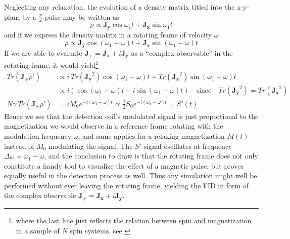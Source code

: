 \documentclass[11.5pt,a4paper]{article}
\begin{document}
Neglecting any relaxation, the evolution of a density matrix titled into the x-y-plane by a $\tfrac{\pi}{2}$-pulse may be written as 
\begin{equation}
 \rho \propto \mathbf{J_y} \cos \omega_1 t + \mathbf{J_x} \sin \omega_1 t
\end{equation}
and if we express the density matrix in a rotating frame of velocity $\omega$
\begin{equation}
 \rho \propto \mathbf{J_y} \cos (\omega_1-\omega) t + \mathbf{J_x} \sin (\omega_1-\omega) t
\end{equation}
If we are able to evaluate $\mathbf{J_+} = \mathbf{J_x} + i \mathbf{J_y}$ as a ``complex observable'' in the rotating frame, it would yield\footnote{where the last line just reflects the relation between spin and magnetization in a sample of $N$ spin systems, see \cite[chap. 4.3.1 Free precession and Faraday detection, p. 125]{nmr-ox}}
\begin{align}
 Tr( \mathbf{J_+} \rho' ) & \propto i\ Tr(\mathbf{J_y}^2) \cos (\omega_1-\omega) t + Tr(\mathbf{J_x}^2) \sin (\omega_1-\omega) t \\
& \propto i ( \cos (\omega_1-\omega) t - i \sin (\omega_1-\omega) t ) \quad \text{since} \quad Tr(\mathbf{J_y}^2) = Tr(\mathbf{J_x}^2) \\
N\gamma \ Tr( \mathbf{J_+} \rho' ) & = i M_0 e^{-i (\omega_1-\omega) t} \propto \frac{1}{2} S_0 e^{-i (\omega_1-\omega) t} = S'(t)
\end{align}
Hence we see that the detection coil's modulated signal is just proportional to the magnetization we would observe in a reference frame rotating with the modulation frequency $\omega$, and same applies for a relaxing magnetization $M(t)$ instead of $M_0$ modulating the signal. The $S'$ signal oscillates at frequency $\Delta \omega = \omega_1 - \omega$, and the conclusion to draw is that the rotating frame does not only constitute a handy tool to visualize the effect of a magnetic pulse, but proves equally useful in the detection process as well. Thus any simulation might well be performed without ever leaving the rotating frame, yielding the FID in form of the complex observable $\mathbf{J_+} = \mathbf{J_x} + i \mathbf{J_y}$.
\end{document}
